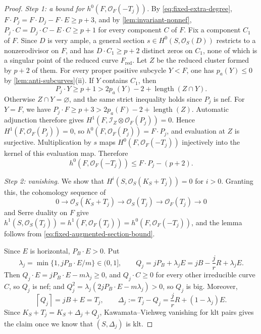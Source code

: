 \documentclass[11pt,reqno]{amsart}
\numberwithin{equation}{section}
\theoremstyle{remark}
\newcommand{\sshf}[1]{\mathcal{O}_{#1}}
\newcommand{\is}[1]{\mathscr I_{#1}}
\newcommand{\pa}{p_a}
\newcommand{\ceil}[1]{\left\lceil #1\right\rceil}
\begin{document}
\begin{proof}
\emph{Step 1: a bound for \(h^0(F,\sshf{F}(-T_j))\).} By \eqref{eq:fixed-extra-degree}, \(F\cdot P_j=F\cdot D_j-F\cdot E\geq p+3\), and by \cref{lem:invariant-nonnef}, \(P_j\cdot C=D_j\cdot C-E\cdot C\geq p+1\) for every component \(C\) of \(F\). Fix a component \(C_1\) of \(F\). Since \(D\) is very ample, a general section \(s\in H^0(S,\sshf{S}(D))\) restricts to a nonzerodivisor on \(F\), and has \(D\cdot C_1\geq p+2\) distinct zeros on \(C_1\), none of which is a singular point of the reduced curve \(F_{\mathrm{red}}\). Let \(Z\) be the reduced cluster formed by \(p+2\) of them. For every proper positive subcycle \(Y<F\), one has \(\pa(Y)\leq0\) by \cref{lem:anti-subcurves}\textup{(ii)}. If \(Y\) contains \(C_1\), then
\[
 P_j\cdot Y\geq p+1>2\pa(Y)-2+\operatorname{length}(Z\cap Y).
\]
Otherwise \(Z\cap Y=\varnothing\), and the same strict inequality holds since \(P_j\) is nef. For \(Y=F\), we have \(P_j\cdot F\geq p+3>2\pa(F)-2+\operatorname{length}(Z)\). Automatic adjunction \cite[Theorem~1.1 and Lemma~2.4]{CFHR} therefore gives
\(H^1(F,\is{Z}\otimes\sshf{F}(P_j))=0\). Hence \(H^1(F,\sshf{F}(P_j))=0\), so \(h^0(F,\sshf{F}(P_j))=F\cdot P_j\), and evaluation at \(Z\) is surjective. Multiplication by \(s\) maps \(H^0(F,\sshf{F}(-T_j))\) injectively into the kernel of this evaluation map. Therefore
\begin{equation}\label{eq:fixed-augmented-section-bound}
 h^0(F,\sshf{F}(-T_j))\leq F\cdot P_j-(p+2).
\end{equation}

\smallskip\noindent\emph{Step 2: vanishing.} We show that \(H^i(S,\sshf{S}(K_S+T_j))=0\) for \(i>0\). Granting this, the cohomology sequence of
\[
 0\longrightarrow\sshf{S}(K_S+T_j)\longrightarrow\sshf{S}(T_j)\longrightarrow\sshf{F}(T_j)\longrightarrow0
\]
and Serre duality on \(F\) give \(h^1(S,\sshf{S}(T_j))=h^1(F,\sshf{F}(T_j))=h^0(F,\sshf{F}(-T_j))\), and the lemma follows from \eqref{eq:fixed-augmented-section-bound}.

Since \(E\) is horizontal, \(P_B\cdot E>0\). Put
\[
 \lambda_j=\min\{1,jP_B\cdot E/m\}\in(0,1],\qquad
 Q_j=jP_B+\lambda_jE=jB-\frac jrR+\lambda_jE.
\]
Then \(Q_j\cdot E=jP_B\cdot E-m\lambda_j\geq0\), and \(Q_j\cdot C\geq0\) for every other irreducible curve \(C\), so \(Q_j\) is nef; and \(Q_j^2=\lambda_j(2jP_B\cdot E-m\lambda_j)>0\), so \(Q_j\) is big. Moreover,
\[
 \ceil{Q_j}=jB+E=T_j,\qquad
 \Delta_j:=T_j-Q_j=\frac jrR+(1-\lambda_j)E.
\]
Since \(K_S+T_j=K_S+\Delta_j+Q_j\), Kawamata--Viehweg vanishing for klt pairs \cite[Corollary~5.7.7]{FujinoKV} gives the claim once we know that \((S,\Delta_j)\) is klt.


\end{proof}
\end{document}

